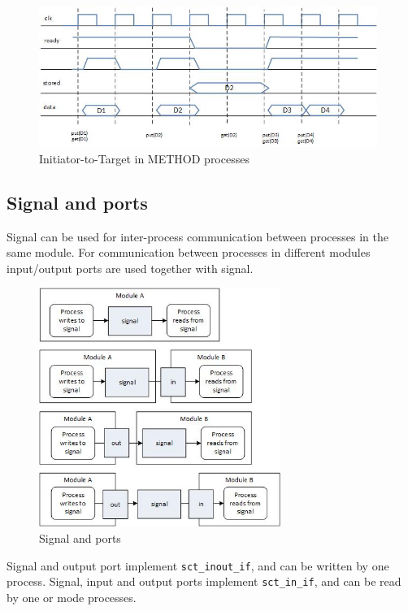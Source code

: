 \begin{figure}[!htb]
\centering
\includegraphics[width=0.98\textwidth]{pics/ss_prot_mm.jpg}
\caption{Initiator-to-Target in METHOD processes}
\label{fig:ss_usage}
\end{figure}

\subsection{Signal and ports}\label{section:sct_signal}
Signal can be used for inter-process communication between processes in the same module. For communication between processes in different modules input/output ports are used together with signal.

\begin{figure}[!htb]
\centering
\includegraphics[width=0.7\textwidth]{pics/ss_sig_usage.jpg}
\caption{Signal and ports}
\label{fig:ss_usage}
\end{figure}

Signal and output port implement {\tt sct\_inout\_if}, and can be written by one process. Signal, input and output ports implement {\tt sct\_in\_if}, and can be read by one or mode processes.

